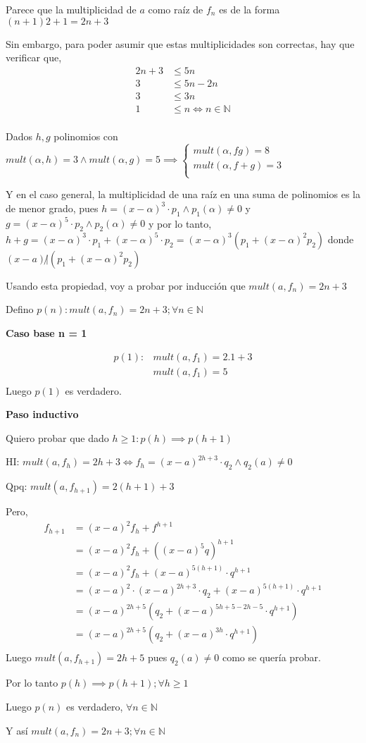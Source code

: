 Parece que la multiplicidad de $a$ como raíz de $f_n$ es de la forma $ (n+1)2 + 1 = 2n+3 $

Sin embargo, para poder asumir que estas multiplicidades son correctas, hay que verificar que,
\begin{align*}
    2n+3 &\leq 5n \\
    3 &\leq 5n-2n \\
    3 &\leq 3n \\
    1 &\leq n \iff n \in \mathbb{N} \\
\end{align*}

Dados $h, g$ polinomios con $ mult(\alpha, h) = 3 \wedge mult(\alpha, g) = 5 \implies \begin{cases}
    mult(\alpha, fg) = 8 \\
    mult(\alpha, f + g) = 3 \\
\end{cases} $

Y en el caso general, la multiplicidad de una raíz en una suma de polinomios es la de menor grado, pues
$ h = (x-\alpha)^3 \cdot p_1 \wedge p_1(\alpha) \neq 0 $ y $ g = (x-\alpha)^5 \cdot p_2 \wedge p_2(\alpha) \neq 0  $
y por lo tanto, $ h+g = (x-\alpha)^3 \cdot p_1 + (x-\alpha)^5 \cdot p_2 = (x-\alpha)^3(p_1 + (x-\alpha)^2p_2) $
donde $ (x-a) \not | (p_1 + (x-\alpha)^2p_2) $

Usando esta propiedad, voy a probar por inducción que $ mult(a, f_n) = 2n+3 $

Defino $ p(n): mult(a, f_n) = 2n+3; \forall n \in \mathbb{N} $

\textbf{Caso base n = 1}

\begin{align*}
    p(1): &mult(a, f_1) = 2.1+3 \\
    &mult(a, f_1) = 5 \\
\end{align*}
Luego $ p(1) $ es verdadero.

\textbf{Paso inductivo}

Quiero probar que dado $ h \geq 1: p(h) \implies p(h+1) $

HI: $ mult(a, f_h) = 2h+3 \iff f_h = (x-a)^{2h+3} \cdot q_2 \wedge q_2(a) \neq 0 $

Qpq: $ mult(a, f_{h+1}) = 2(h+1)+3 $

Pero,
\begin{align*}
    f_{h+1} &= (x-a)^2f_h + f^{h+1} \\
    &= (x-a)^2f_h + ((x-a)^5q)^{h+1} \\
    &= (x-a)^2f_h + (x-a)^{5(h+1)} \cdot q^{h+1} \\
    &= (x-a)^2 \cdot (x-a)^{2h+3} \cdot q_2 + (x-a)^{5(h+1)} \cdot q^{h+1} \\
    &= (x-a)^{2h+5} (q_2 + (x-a)^{5h+5-2h-5} \cdot q^{h+1}) \\
    &= (x-a)^{2h+5} (q_2 + (x-a)^{3h} \cdot q^{h+1}) \\
\end{align*}
Luego $ mult(a, f_{h+1}) = 2h+5 $ pues $ q_2(a) \neq 0 $ como se quería probar.

Por lo tanto $ p(h) \implies p(h+1); \forall h \geq 1 $

Luego $ p(n) $ es verdadero, $ \forall n \in \mathbb{N} $

Y así $ mult(a, f_n) = 2n+3; \forall n \in \mathbb{N} $


